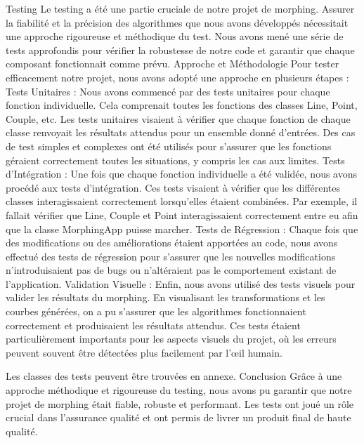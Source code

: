 Testing
Le testing a été une partie cruciale de notre projet de morphing. Assurer la fiabilité et la précision des algorithmes que nous avons développés nécessitait une approche rigoureuse et méthodique du test. Nous avons mené une série de tests approfondis pour vérifier la robustesse de notre code et garantir que chaque composant fonctionnait comme prévu.
Approche et Méthodologie
Pour tester efficacement notre projet, nous avons adopté une approche en plusieurs étapes :
Tests Unitaires :
Nous avons commencé par des tests unitaires pour chaque fonction individuelle. Cela comprenait toutes les fonctions des classes Line, Point, Couple, etc. Les tests unitaires visaient à vérifier que chaque fonction de chaque classe renvoyait les résultats attendus pour un ensemble donné d'entrées. Des cas de test simples et complexes ont été utilisés pour s'assurer que les fonctions géraient correctement toutes les situations, y compris les cas aux limites.
Tests d'Intégration :
Une fois que chaque fonction individuelle a été validée, nous avons procédé aux tests d'intégration. Ces tests visaient à vérifier que les différentes classes interagissaient correctement lorsqu'elles étaient combinées. Par exemple, il fallait vérifier que Line, Couple et Point interagissaient correctement entre eu afin que la classe MorphingApp puisse marcher.
Tests de Régression :
Chaque fois que des modifications ou des améliorations étaient apportées au code, nous avons effectué des tests de régression pour s'assurer que les nouvelles modifications n'introduisaient pas de bugs ou n'altéraient pas le comportement existant de l'application.
Validation Visuelle :
Enfin, nous avons utilisé des tests visuels pour valider les résultats du morphing. En visualisant les transformations et les courbes générées, on a pu s'assurer que les algorithmes fonctionnaient correctement et produisaient les résultats attendus. Ces tests étaient particulièrement importants pour les aspects visuels du projet, où les erreurs peuvent souvent être détectées plus facilement par l'œil humain.


Les classes des tests peuvent être trouvées en annexe.
Conclusion
Grâce à une approche méthodique et rigoureuse du testing, nous avons pu garantir que notre projet de morphing était fiable, robuste et performant. Les tests ont joué un rôle crucial dans l'assurance qualité et ont permis de livrer un produit final de haute qualité.

